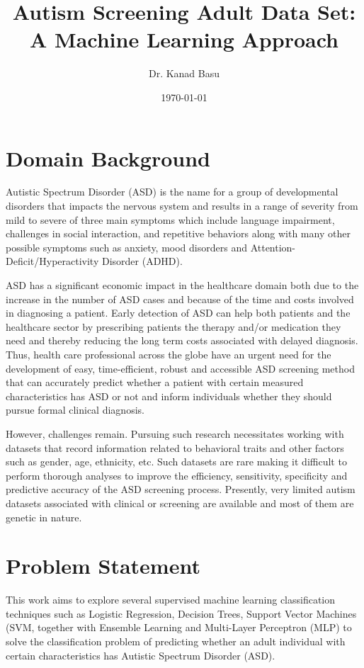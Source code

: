 \documentclass[12pt, oneside]{article}
\title{Autism Screening Adult Data Set: A Machine Learning Approach}
\author{Dr. Kanad Basu}
\date{\today}
\theoremstyle{definition}
\begin{document}
\maketitle

\newenvironment{myitemize}
{ \begin{itemize}
    \setlength{\itemsep}{0pt}
    \setlength{\parskip}{0pt}
    \setlength{\parsep}{0pt}     }
{ \end{itemize}                  } 

\section{Domain Background}
Autistic Spectrum Disorder (ASD) is the name for a group of developmental disorders that impacts the nervous system and results in a range of severity from mild to severe of three main symptoms which include language impairment, challenges in social interaction, and repetitive behaviors along with many other possible symptoms such as anxiety, mood disorders and Attention-Deficit/Hyperactivity Disorder (ADHD). 

ASD has a significant economic impact in the healthcare domain both due to the increase in the number of ASD cases and because of the time and costs involved in diagnosing a patient. Early detection of ASD can help both patients and the healthcare sector by prescribing patients the therapy and/or medication they need and thereby reducing the long term costs associated with delayed diagnosis. Thus, health care professional across the globe have an urgent need for the development of easy, time-efficient, robust  and accessible ASD screening method that can accurately predict whether a patient with certain measured characteristics has ASD or not and inform individuals whether they should pursue formal clinical diagnosis. 

However, challenges remain. Pursuing such research necessitates working with datasets that record information related to behavioral traits and other factors such as gender, age, ethnicity, etc. Such datasets are rare making it difficult to perform thorough analyses to improve the efficiency, sensitivity, specificity and predictive accuracy of the ASD screening process. Presently, very limited autism datasets associated with clinical or screening are available and most of them are genetic in nature.
\section{Problem Statement}
This work aims to explore several supervised machine learning classification techniques such as Logistic Regression, Decision Trees, Support Vector Machines (SVM, together with Ensemble Learning and Multi-Layer Perceptron (MLP) to solve the classification problem of predicting whether an adult individual with certain characteristics has Autistic Spectrum Disorder (ASD).
\end{document}

